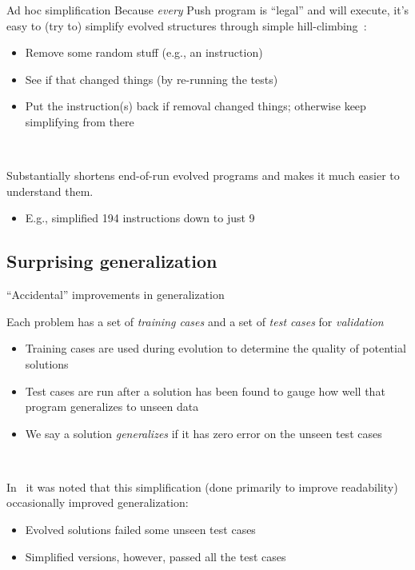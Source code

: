 \documentclass{beamer}
\begin{document}
\begin{frame}{Ad hoc simplification}
Because \emph{every} Push program is ``legal'' and will execute, it's easy to (try to) simplify evolved structures through simple hill-climbing~\cite{Spector:2014:GECCOcomp}:
\begin{itemize}
	\item Remove some random stuff (e.g., an instruction)
	\item See if that changed things (by re-running the tests)
	\item Put the instruction(s) back if removal changed things; otherwise keep simplifying from there
\end{itemize}
 
 ~
 
 Substantially shortens end-of-run evolved programs and makes it much easier to
 understand them.
 \begin{itemize}
 	\item E.g., simplified 194 instructions down to just 9
 \end{itemize}
\end{frame}

\subsection{Surprising generalization}

\begin{frame}{``Accidental'' improvements in generalization}

Each problem has a set of \emph{training cases} and a set of \emph{test cases} for \emph{validation}~\cite{Helmuth:2015:GECCO}
\begin{itemize}
	\item Training cases are used during evolution to determine the quality of potential solutions
	\item Test cases are run after a solution has been found to gauge how well that program generalizes to unseen data
	\item We say a solution \emph{generalizes} if it has zero error on the unseen test cases
\end{itemize}

~

In~\cite{Helmuth:2015:dissertation} it was noted that this simplification (done primarily to improve readability) occasionally improved generalization:
\begin{itemize}
	\item Evolved solutions failed some unseen test cases
	\item Simplified versions, however, passed all the test cases
\end{itemize}


\end{frame}
\end{document}

